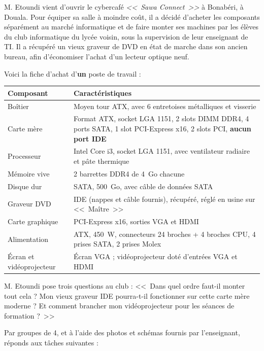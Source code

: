 \documentclass[11pt]{article}
\newcounter{popsec}
\newcounter{popsub}
\newcommand{\courssub}[1]{%
  \stepcounter{popsub}%
  \par\vspace{9pt}\noindent{\popxbold\fontsize{11.5}{13}\selectfont\color{popink}{\color{poporange}\thepopsec.\thepopsub}\hspace{6pt}#1}\par\nopagebreak\vspace{4pt}
}
\begin{document}
\courssub{Situation}

M. Etoundi vient d'ouvrir le cybercafé \emph{<<~Sawa Connect~>>} à Bonabéri, à Douala. Pour équiper sa salle à moindre coût, il a décidé d'acheter les composants séparément au marché informatique et de faire monter ses machines par les élèves du club informatique du lycée voisin, sous la supervision de leur enseignant de TI. Il a récupéré un vieux graveur de DVD en état de marche dans son ancien bureau, afin d'économiser l'achat d'un lecteur optique neuf.

Voici la fiche d'achat d'\textbf{un} poste de travail :

\begin{center}
\begin{tabularx}{\linewidth}{|l|X|}
\hline
\rowcolor{popblueL} \textbf{Composant} & \textbf{Caractéristiques} \\
\hline
Boîtier & Moyen tour ATX, avec 6 entretoises métalliques et visserie \\
\hline
Carte mère & Format ATX, socket LGA 1151, 2 slots DIMM DDR4, 4 ports SATA, 1 slot PCI-Express x16, 2 slots PCI, \textbf{aucun port IDE} \\
\hline
Processeur & Intel Core i3, socket LGA 1151, avec ventilateur radiaire et pâte thermique \\
\hline
Mémoire vive & 2 barrettes DDR4 de \SI{4}{Go} chacune \\
\hline
Disque dur & SATA, \SI{500}{Go}, avec câble de données SATA \\
\hline
Graveur DVD & IDE (nappes et câble fournis), récupéré, réglé en usine sur <<~Maître~>> \\
\hline
Carte graphique & PCI-Express x16, sorties VGA et HDMI \\
\hline
Alimentation & ATX, \SI{450}{W}, connecteurs 24 broches + 4 broches CPU, 4 prises SATA, 2 prises Molex \\
\hline
Écran et vidéoprojecteur & Écran VGA ; vidéoprojecteur doté d'entrées VGA et HDMI \\
\hline
\end{tabularx}
\end{center}

M. Etoundi pose trois questions au club : <<~Dans quel ordre faut-il monter tout cela ? Mon vieux graveur IDE pourra-t-il fonctionner sur cette carte mère moderne ? Et comment brancher mon vidéoprojecteur pour les séances de formation ?~>>

\courssub{Consignes}

Par groupes de 4, et à l'aide des photos et schémas fournis par l'enseignant, réponds aux tâches suivantes :
\end{document}

